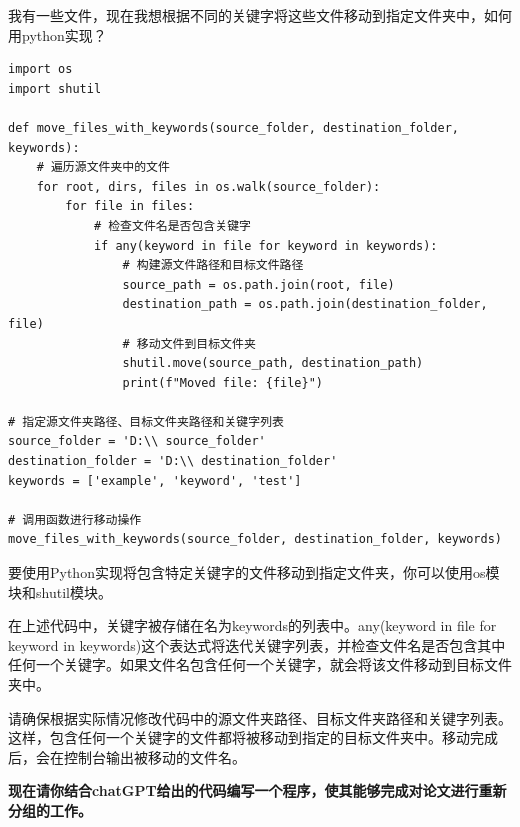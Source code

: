 \documentclass[10pt]{elegantnote}
\begin{document}
\begin{sloppypar}
\begin{framed}
    我有一些文件，现在我想根据不同的关键字将这些文件移动到指定文件夹中，如何用python实现？
\end{framed}

\begin{lstlisting}
import os
import shutil

def move_files_with_keywords(source_folder, destination_folder, keywords):
    # 遍历源文件夹中的文件
    for root, dirs, files in os.walk(source_folder):
        for file in files:
            # 检查文件名是否包含关键字
            if any(keyword in file for keyword in keywords):
                # 构建源文件路径和目标文件路径
                source_path = os.path.join(root, file)
                destination_path = os.path.join(destination_folder, file)
                # 移动文件到目标文件夹
                shutil.move(source_path, destination_path)
                print(f"Moved file: {file}")

# 指定源文件夹路径、目标文件夹路径和关键字列表
source_folder = 'D:\\ source_folder'
destination_folder = 'D:\\ destination_folder'
keywords = ['example', 'keyword', 'test']

# 调用函数进行移动操作
move_files_with_keywords(source_folder, destination_folder, keywords)    
\end{lstlisting}

\begin{framed}
要使用Python实现将包含特定关键字的文件移动到指定文件夹，你可以使用os模块和shutil模块。

在上述代码中，关键字被存储在名为keywords的列表中。any(keyword in file for keyword in keywords)这个表达式将迭代关键字列表，并检查文件名是否包含其中任何一个关键字。如果文件名包含任何一个关键字，就会将该文件移动到目标文件夹中。

请确保根据实际情况修改代码中的源文件夹路径、目标文件夹路径和关键字列表。这样，包含任何一个关键字的文件都将被移动到指定的目标文件夹中。移动完成后，会在控制台输出被移动的文件名。
\end{framed}

{\bfseries 现在请你结合chatGPT给出的代码编写一个程序，使其能够完成对论文进行重新分组的工作。}

\end{sloppypar}
\end{document}
